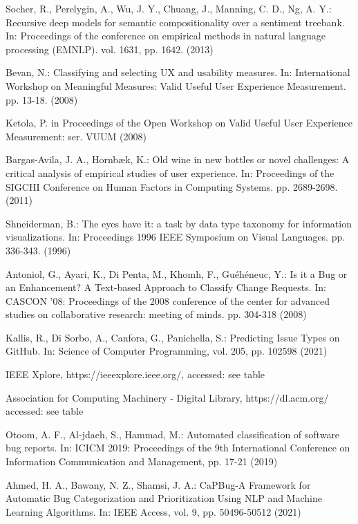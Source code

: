 \documentclass[a4paper,10pt, bibliography=totocnumbered]{scrreprt}
\begin{document}
\begin{thebibliography}{9}
 Socher, R., Perelygin, A., Wu, J. Y., Chuang, J., Manning, C. D., Ng, A. Y.: Recursive deep models for semantic compositionality over a sentiment treebank.
In: Proceedings of the conference on empirical methods in natural language processing (EMNLP). vol. 1631, pp. 1642. (2013)

 Bevan, N.: Classifying and selecting UX and usability measures.
In: International Workshop on Meaningful Measures: Valid Useful User Experience Measurement. pp. 13-18. (2008)

 Ketola, P. in Proceedings of the Open Workshop on Valid Useful User Experience Measurement: ser. VUUM (2008)

 Bargas-Avila, J. A., Hornbæk, K.: Old wine in new bottles or novel challenges: A critical analysis of empirical studies of user experience.
In: Proceedings of the SIGCHI Conference on Human Factors in Computing Systems. pp. 2689-2698. (2011)

 Shneiderman, B.: The eyes have it: a task by data type taxonomy for information visualizations.
In: Proceedings 1996 IEEE Symposium on Visual Languages. pp. 336-343. (1996)

 Antoniol, G., Ayari, K., Di Penta, M., Khomh, F., Guéhéneuc, Y.: Is it a Bug or an Enhancement? A Text-based Approach to Classify Change Requests.
In: CASCON '08: Proceedings of the 2008 conference of the center for advanced studies on collaborative research: meeting of minds. pp. 304-318 (2008)

 Kallis, R., Di Sorbo, A., Canfora, G., Panichella, S.: Predicting Issue Types on GitHub.
In: Science of Computer Programming, vol. 205, pp. 102598 (2021)

 IEEE Xplore, https://ieeexplore.ieee.org/, accessed: see table

 Association for Computing Machinery - Digital Library, https://dl.acm.org/ accessed: see table

 Otoom, A. F., Al-jdaeh, S., Hammad, M.: Automated classification of software bug reports.
In: ICICM 2019: Proceedings of the 9th International Conference on Information Communication and Management, pp. 17-21 (2019)

 Ahmed, H. A., Bawany, N. Z., Shamsi, J. A.: CaPBug-A Framework for Automatic Bug Categorization and Prioritization Using NLP and Machine Learning Algorithms.
In: IEEE Access, vol. 9, pp. 50496-50512 (2021)
\end{thebibliography}

\listoffigures

\listoftables
\end{document}

